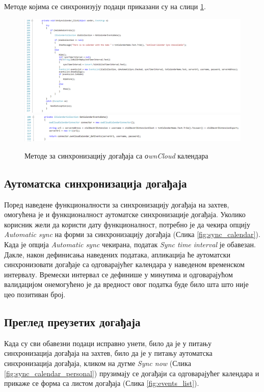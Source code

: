 Методе којима се синхронизују подаци приказани су на слици \ref{fig:sync_calendar_method}.

\begin{figure}[H]
	\centering
	\includegraphics[scale=0.5]{slike/SyncCalendarMethod.png}
	\includegraphics[scale=0.5]{slike/GetCalendarEventsDataMethod.png}
	\caption{Методе за синхронизацију догађаја са \textit{оwnCloud} календара}
	\label{fig:sync_calendar_method}
\end{figure}

\subsection{Аутоматска синхронизација догађаја}

Поред наведене функционалности за синхронизацију догађаја на захтев, омогућена је и функционалност аутоматске синхронизације догађаја. Уколико корисник жели да користи дату функционалност, потребно је да чекира опцију \textit{Automatic sync} на форми за синхронизацију догађаја (Слика \ref{fig:sync_calendar}). Када је опција \textit{Automatic sync} чекирана, податак \textit{Sync time interval} је обавезан. Дакле, након дефинисања наведених података, апликација ће аутоматски синхронизовати догађаје са одговарајућег календара у наведеном временском интервалу. Времески интервал се дефинише у минутима и одговарајућом валидацијом онемогућено је да вредност овог податка буде било шта што није цео позитиван број.

\subsection{Преглед преузетих догађаја}
Када су сви обавезни подаци исправно унети, било да је у питању синхронизација догађаја на захтев, било да је у питању аутоматска синхронизација догађаја, кликом на дугме \textit{Sync now} (Слика \ref{fig:sync_calendar_personal}) прузимају се догађаји са одговарајућег календара и прикаже се форма са листом догађаја (Слика \ref{fig:events_list}).

